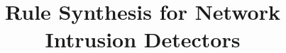 \documentclass[conference]{IEEEtran}
\begin{document}
%
%
\newcommand{\argmin}{\mathop{\mathrm{{arg\,min}}}}

%
%

  {\newcommand{\nb}[3]{
  {\color{#2}\small\fbox{\bfseries\sffamily\scriptsize#1}}
  {\color{#2}\sffamily\small$\triangleright~$\textit{\small #3}$~\triangleleft$}
  }
  }
  {\newcommand{\nb}[3]{}
  }

\title{Rule Synthesis for Network Intrusion Detectors}


\end{document}
